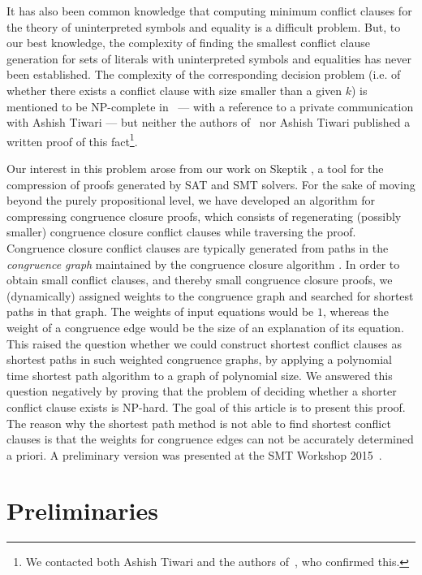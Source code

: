 \documentclass[smallextended]{svjour3}
\begin{document}
It has also been common knowledge that computing minimum conflict clauses for
the theory of uninterpreted symbols and equality is a difficult problem.  But,
to our best knowledge, the complexity of finding the smallest conflict clause generation
for sets of literals with uninterpreted symbols and equalities has never been
established.  The complexity of the corresponding decision problem (i.e. of whether there exists a conflict clause with size smaller than a given $k$) is mentioned to be NP-complete in~\cite{Nieuwenhuis6} --- with
a reference to a private communication with Ashish Tiwari --- but neither the
authors of~\cite{Nieuwenhuis6} nor Ashish Tiwari published a written proof of
this fact\footnote{We contacted both Ashish Tiwari and the authors
  of~\cite{Nieuwenhuis6}, who confirmed this.}.

Our interest in this problem arose from our work on Skeptik \cite{Boudou1}, a tool for the compression of proofs generated by SAT and SMT solvers. For the sake of moving beyond the purely propositional level, we have developed an algorithm for compressing congruence closure proofs, which consists of regenerating (possibly smaller) congruence closure conflict clauses while traversing the proof. 
Congruence closure conflict clauses are typically generated from paths in the \emph{congruence graph} maintained by the congruence closure algorithm \cite{Fontaine2004,Nieuwenhuis6,Nieuwenhuis9}. 
In order to obtain small conflict clauses, and thereby small congruence closure proofs, we (dynamically) assigned weights to the congruence graph and searched for shortest paths in that graph.
The weights of input equations would be $1$, whereas the weight of a congruence edge would be the size of an explanation of its equation.
This raised the question whether we could construct shortest conflict clauses as shortest paths in such weighted congruence graphs, by applying a polynomial time shortest path algorithm to a graph of polynomial size.
We answered this question negatively by proving that the problem of deciding whether a shorter conflict clause exists is NP-hard. 
The goal of this article is to present this proof.
The reason why the shortest path method is not able to find shortest conflict clauses is that the weights for congruence edges can not be accurately determined a priori.
A preliminary version was presented at the SMT Workshop 2015~\cite{Fellner1}.

\section{Preliminaries}
\end{document}
